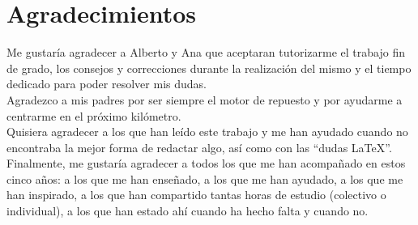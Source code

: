
\chapter*{Agradecimientos}

Me gustaría agradecer a Alberto y Ana que aceptaran tutorizarme el trabajo fin de grado, los consejos y correcciones durante la realización del mismo y el tiempo dedicado para poder resolver mis dudas.\\

Agradezco a mis padres por ser siempre el motor de repuesto y por ayudarme a centrarme en el próximo kilómetro.\\

Quisiera agradecer a los que han leído este trabajo y me han ayudado cuando no encontraba la mejor forma de redactar algo, así como con las ``dudas \LaTeX''.\\

Finalmente, me gustaría agradecer a todos los que me han acompañado en estos cinco años: a los que me han enseñado, a los que me han ayudado, a los que  me han inspirado, a los que han compartido tantas horas de estudio (colectivo o individual), a los que han estado ahí cuando ha hecho falta y cuando no. 

